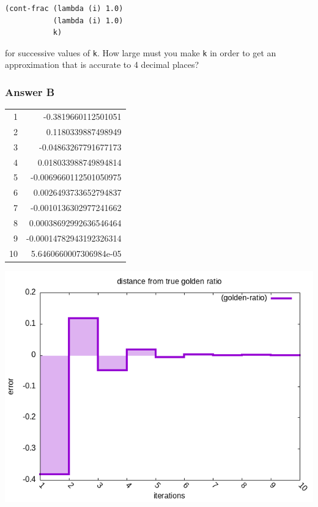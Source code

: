 \documentclass[final,fleqn,titlepage,twoside]{article}
\begin{document}
\begin{verbatim}
(cont-frac (lambda (i) 1.0)
           (lambda (i) 1.0)
           k)
\end{verbatim}

for successive values of \texttt{k}. How large must you make \texttt{k} in
order to get an approximation that is accurate to 4 decimal places?

\subsubsection{Answer B}
\label{sec:org57828a4}
\begin{center}
\begin{tabular}{rr}
1 & -0.3819660112501051\\[0pt]
2 & 0.1180339887498949\\[0pt]
3 & -0.04863267791677173\\[0pt]
4 & 0.018033988749894814\\[0pt]
5 & -0.0069660112501050975\\[0pt]
6 & 0.0026493733652794837\\[0pt]
7 & -0.0010136302977241662\\[0pt]
8 & 0.00038692992636546464\\[0pt]
9 & -0.00014782943192326314\\[0pt]
10 & 5.6460660007306984e-05\\[0pt]
\end{tabular}
\end{center}


\begin{center}
\includegraphics[width=.9\linewidth]{1/fig/1-36-1.png}
\end{center}
\end{document}

